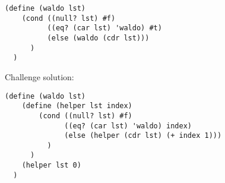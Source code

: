 \documentclass{exam}
\begin{document}
\begin{questions}
\begin{blocksection}
\begin{solution}[0.5in]
\begin{lstlisting}
(define (waldo lst)
    (cond ((null? lst) #f)
          ((eq? (car lst) 'waldo) #t)
          (else (waldo (cdr lst)))
      )
  )
\end{lstlisting}
Challenge solution:
\begin{lstlisting}
(define (waldo lst)
    (define (helper lst index)
        (cond ((null? lst) #f)
              ((eq? (car lst) 'waldo) index)
              (else (helper (cdr lst) (+ index 1)))
          )
      )
    (helper lst 0)
  )
\end{lstlisting}
\end{solution}

\end{blocksection}

\end{questions}

\end{document}
